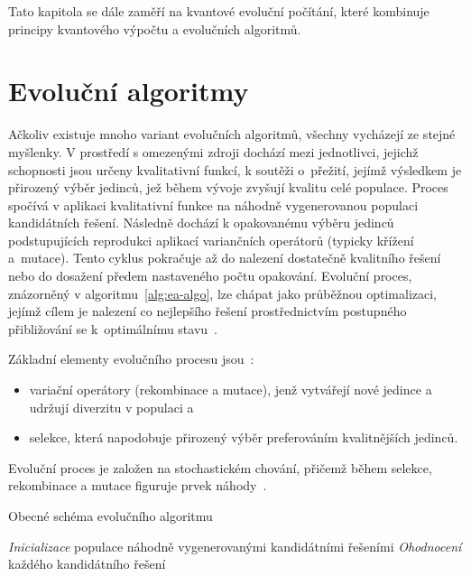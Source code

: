 Tato kapitola se dále zaměří na kvantové evoluční počítání, které kombinuje principy kvantového výpočtu a evolučních algoritmů.

\section{Evoluční algoritmy}\label{sec:ea}
Ačkoliv existuje mnoho variant evolučních algoritmů, všechny vycházejí ze stejné myšlenky. 
V prostředí s omezenými zdroji dochází mezi jednotlivci, jejichž schopnosti jsou určeny kvalitativní funkcí, k soutěži o~přežití, jejímž výsledkem je přirozený výběr jedinců, jež během vývoje zvyšují kvalitu celé populace. 
Proces spočívá v aplikaci kvalitativní funkce na náhodně vygenerovanou populaci kandidátních řešení. 
Následně dochází k opakovanému výběru jedinců podstupujících reprodukci aplikací variančních operátorů (typicky křížení a~mutace).
Tento cyklus pokračuje až do nalezení dostatečně kvalitního řešení nebo do dosažení předem nastaveného počtu opakování.  
Evoluční proces, znázorněný v algoritmu~\ref{alg:ea-algo}, lze chápat jako průběžnou optimalizaci, jejímž cílem je nalezení co nejlepšího řešení prostřednictvím postupného přibližování se k~optimálnímu stavu~\cite{IntroductionToEvoComputing}. 

Základní elementy evolučního procesu jsou~\cite{IntroductionToEvoComputing}:
\begin{itemize}
    \item variační operátory (rekombinace a mutace), jenž vytvářejí nové jedince a udržují diverzitu v populaci a
    \item selekce, která napodobuje přirozený výběr preferováním kvalitnějších jedinců. 
\end{itemize}
Evoluční proces je založen na stochastickém chování, přičemž během selekce, rekombinace a mutace figuruje prvek náhody~\cite{IntroductionToEvoComputing}. 

\begin{algorithm}[H]
    \caption{Obecné schéma evolučního algoritmu~\cite{IntroductionToEvoComputing}}
    \label{alg:ea-algo}
    \emph{Inicializace} populace náhodně vygenerovanými kandidátními řešeními\;
    \emph{Ohodnocení} každého kandidátního řešení\;
\end{algorithm}

